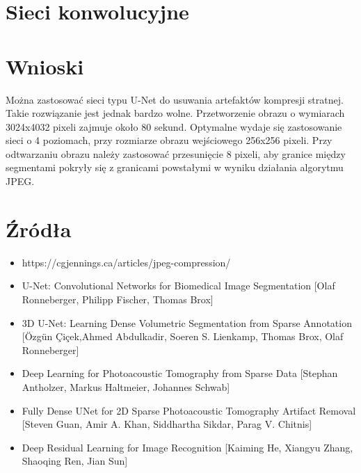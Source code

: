 \documentclass[a4paper,11pt]{article}
\begin{document}
\section{Sieci konwolucyjne}
\section{Wnioski}
Można zastosować sieci typu U-Net do usuwania artefaktów kompresji stratnej.
Takie rozwiązanie jest jednak bardzo wolne. Przetworzenie obrazu o wymiarach 3024x4032 pixeli zajmuje około 80 sekund.
Optymalne wydaje się zastosowanie sieci o 4 poziomach, przy rozmiarze obrazu wejściowego 256x256 pixeli.
Przy odtwarzaniu obrazu należy zastosować przesunięcie 8 pixeli, aby granice między segmentami pokryły się z granicami powstałymi w wyniku działania algorytmu JPEG.

\section{Źródła}
\begin{itemize}
\item https://cgjennings.ca/articles/jpeg-compression/
\item U-Net: Convolutional Networks for Biomedical Image Segmentation [Olaf Ronneberger, Philipp Fischer, Thomas Brox]
\item 3D U-Net: Learning Dense Volumetric Segmentation from Sparse Annotation [Özgün Çiçek,Ahmed Abdulkadir, Soeren S. Lienkamp, Thomas Brox, Olaf Ronneberger]
\item Deep Learning for Photoacoustic Tomography from Sparse Data [Stephan Antholzer, Markus Haltmeier, Johannes Schwab]
\item Fully Dense UNet for 2D Sparse Photoacoustic Tomography Artifact Removal [Steven Guan, Amir A. Khan, Siddhartha Sikdar, Parag V. Chitnis]
\item Deep Residual Learning for Image Recognition [Kaiming He, Xiangyu Zhang, Shaoqing Ren, Jian Sun]

\end{itemize}
\end{document}
